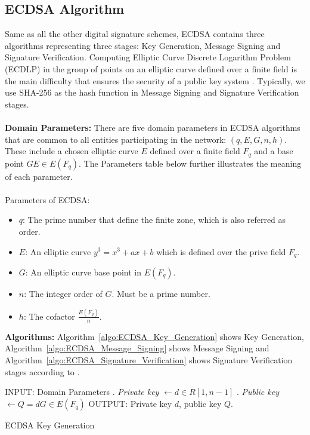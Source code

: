 \documentclass[10pt,sigconf]{acmart}
\begin{document}
\subsection{ECDSA Algorithm}

Same as all the other digital signature schemes, ECDSA contains three algorithms representing three stages: Key Generation, Message Signing and Signature Verification. Computing Elliptic Curve Discrete Logarithm Problem (ECDLP) in the group of points on an elliptic curve defined over a finite field is the main difficulty that ensures the security of a public key system \cite{imem2015comparison}. Typically, we use SHA-256 as the hash function in Message Signing and Signature Verification stages.
\\
\\
\noindent \textbf{Domain Parameters:} \quad There are five domain parameters in ECDSA algorithms that are common to all entities participating in the network: $(q, E, G, n, h)$. These include a chosen elliptic curve $E$ defined over a finite field $F_q$ and a base point $GE \in E(F_q)$. The Parameters table below further illustrates the meaning of each parameter.
\\
\\
\noindent Parameters of ECDSA:
\begin{itemize}
    \item $q$: The prime number that define the finite zone, which is also referred as order.
    \item $E$: An elliptic curve $y^3 = x^3 + ax + b$ which is defined over the prive field $F_q$.
    \item $G$: An elliptic curve base point in $E(F_q)$.
    \item $n$: The integer order of $G$. Must be a prime number.
    \item $h$: The cofactor $\frac{E(F_q)}{n}$.
\end{itemize}

\vspace{0.2em}

\noindent \textbf{Algorithms:} \quad Algorithm~\ref{algo:ECDSA_Key_Generation} shows Key Generation, Algorithm~\ref{algo:ECDSA_Message_Signing} shows Message Signing and Algorithm~\ref{algo:ECDSA_Signature_Verification} shows Signature Verification stages according to \cite{karati2014new}.

\begin{algorithm}[H]
\begin{algorithmic}
\STATE INPUT: Domain Parameters
. \textit{Private key} $\gets d \in R [1, n-1]$
. \textit{Public key} $\gets Q = dG \in E(F_q)$
\STATE OUTPUT: Private key $d$, public key $Q$.
\end{algorithmic}
\caption{ECDSA Key Generation}
\label{algo:ECDSA_Key_Generation}
\end{algorithm}
\end{document}
